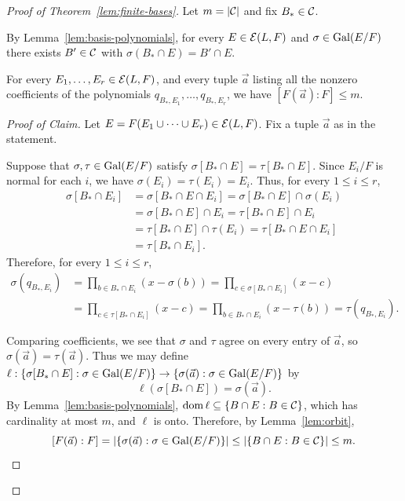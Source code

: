 \setcounter{claim}{0}
\begin{proof}[Proof of Theorem~\ref{lem:finite-bases}]
Let $m=|\mathcal C|$ and fix $B_*\in\mathcal C$.

By Lemma~\ref{lem:basis-polynomials}, for every $E\in\mathcal E(L,F)$ and
$\sigma\in\operatorname{Gal}(E/F)$ there exists $B'\in\mathcal C$ with
$\sigma(B_*\cap E)=B'\cap E$.

\begin{claim}\label{claim:coeff-degree}
       For every $E_1,\ldots,E_r\in\mathcal E(L,F)$, and every tuple $\vec a$ listing all the nonzero coefficients of the polynomials $q_{B_*,E_1},\ldots,q_{B_*,E_r}$, we have $[F(\vec a):F]\le m$.
\end{claim}
\begin{proof}[Proof of Claim]
       Let $E=F(E_1\cup\dots\cup E_r)\in\mathcal E(L,F)$.
       Fix a tuple $\vec a$ as in the statement.

       Suppose that $\sigma,\tau\in\operatorname{Gal}(E/F)$ satisfy
       $\sigma[B_*\cap E]=\tau[B_*\cap E]$.
       Since $E_i/F$ is normal for each $i$, we have
       $\sigma(E_i)=\tau(E_i)=E_i$.
       Thus, for every $1\le i\le r$,
       \begin{align*}
       \sigma[B_*\cap E_i]
       &=\sigma[B_*\cap E\cap E_i]
        =\sigma[B_*\cap E]\cap\sigma(E_i)\\
       &=\sigma[B_*\cap E]\cap E_i
        =\tau[B_*\cap E]\cap E_i\\
       &=\tau[B_*\cap E]\cap\tau(E_i)
        =\tau[B_*\cap E\cap E_i]\\
       &=\tau[B_*\cap E_i].
       \end{align*}
       Therefore, for every $1\le i\le r$,
       \[
       \begin{aligned}
       \sigma(q_{B_*,E_i})
       &=\prod_{b\in B_*\cap E_i}(x-\sigma(b))
        =\prod_{c\in\sigma[B_*\cap E_i]}(x-c)\\
       &=\prod_{c\in\tau[B_*\cap E_i]}(x-c)
        =\prod_{b\in B_*\cap E_i}(x-\tau(b))
        =\tau(q_{B_*,E_i}).
       \end{aligned}
       \]
       
       Comparing coefficients, we see that $\sigma$ and $\tau$
       agree on every entry of $\vec a$, so
       $\sigma(\vec a)=\tau(\vec a)$.
       Thus we may define $\ell:\{\sigma[B_*\cap E]:\sigma\in\operatorname{Gal}(E/F)\}\to\{\sigma(\vec a):\sigma\in\operatorname{Gal}(E/F)\}$ by
       \[
       \ell(\sigma[B_*\cap E])=\sigma(\vec a).
       \]
       By Lemma~\ref{lem:basis-polynomials}, $\operatorname{dom} \ell\subseteq\{B\cap E:B\in\mathcal C\}$, which has cardinality at most $m$, and $\ell$ is onto.
       Therefore, by Lemma~\ref{lem:orbit},
       \[
       [F(\vec a):F]
       =|\{\sigma(\vec a):\sigma\in\operatorname{Gal}(E/F)\}|\leq|\{B\cap E:B\in\mathcal C\}|\le m.\qedhere
       \]
\end{proof}


\end{proof}
